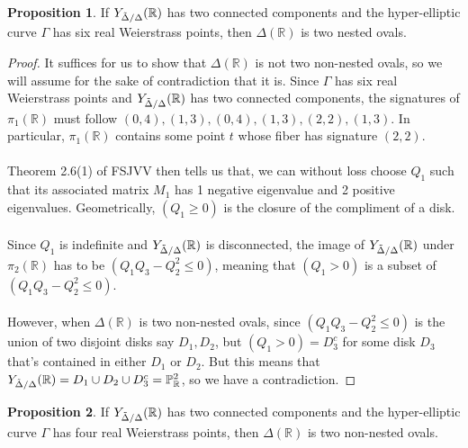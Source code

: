 \documentclass{article}
\newcommand{\Rbb}{\mathbb{R}}
\newcommand{\Pbb}{\mathbb{P}}
\begin{document}
\theoremstyle{definition}
\newtheorem{theorem}{Theorem}[section]
\theoremstyle{definition}
\newtheorem{conjecture}[theorem]{Conjecture}
\theoremstyle{definition}
\newtheorem{definition}[theorem]{Definition}
\theoremstyle{definition}
\newtheorem{goal}[theorem]{Goal}
\theoremstyle{definition}
\newtheorem{corollary}[theorem]{Corollary}
\theoremstyle{definition}
\newtheorem{question}[theorem]{Question}
\theoremstyle{definition}
\newtheorem{lemma}[theorem]{Lemma}
\theoremstyle{definition}
\newtheorem{proposition}[theorem]{Proposition}

\begin{proposition}
    If $Y_{\Tilde{\Delta}/\Delta}(\Rbb)$ has two connected components and the hyper-elliptic curve $\Gamma$ has six real Weierstrass points, then $\Delta(\Rbb)$ is two nested ovals.
\end{proposition}

\begin{proof}
It suffices for us to show that $\Delta(\Rbb)$ is not two non-nested ovals, so we will assume for the sake of contradiction that it is. Since $\Gamma$ has six real Weierstrass points and $Y_{\Tilde{\Delta}/\Delta}(\Rbb)$ has two connected components, the signatures of $\pi_1(\Rbb)$ must follow $(0, 4), (1, 3), (0, 4), (1, 3), (2, 2), (1, 3)$. In particular, $\pi_1(\Rbb)$ contains some point $t$ whose fiber has signature $(2, 2)$.\\\\
Theorem 2.6(1) of FSJVV then tells us that, we can without loss choose $Q_1$ such that its associated matrix $M_1$ has 1 negative eigenvalue and 2 positive eigenvalues. Geometrically, $(Q_1 \geq 0)$ is the closure of the compliment of a disk.\\\\
Since $Q_1$ is indefinite and $Y_{\Tilde{\Delta}/\Delta}(\Rbb)$  is disconnected, the image of $Y_{\Tilde{\Delta}/\Delta}(\Rbb)$ under $\pi_2(\Rbb)$ has to be $(Q_1 Q_3 - Q_2^2 \leq 0)$, meaning that $(Q_1 > 0)$ is a subset of $(Q_1 Q_3 - Q_2^2 \leq 0)$.\\\\
However, when $\Delta(\Rbb)$ is two non-nested ovals, since $(Q_1 Q_3 - Q_2^2 \leq 0)$ is the union of two disjoint disks say $D_1, D_2$, but $(Q_1 > 0) = D_3^c$ for some disk $D_3$ that's contained in either $D_1$ or $D_2$. But this means that $Y_{\Tilde{\Delta}/\Delta}(\Rbb) = D_1 \cup D_2 \cup D_3^c = \Pbb^2_\Rbb$, so we have a contradiction.
\end{proof}

\begin{proposition}
       If $Y_{\Tilde{\Delta}/\Delta}(\Rbb)$ has two connected components and the hyper-elliptic curve $\Gamma$ has four real Weierstrass points, then $\Delta(\Rbb)$ is two non-nested ovals. 
\end{proposition}
\end{document}
